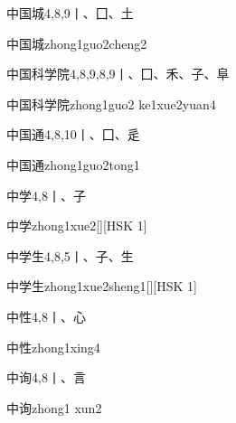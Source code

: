 \begin{entry}{中国城}{4,8,9}{⼁、⼞、⼟}
  \begin{phonetics}{中国城}{zhong1guo2cheng2}
  \end{phonetics}
\end{entry}

\begin{entry}{中国科学院}{4,8,9,8,9}{⼁、⼞、⽲、⼦、⾩}
  \begin{phonetics}{中国科学院}{zhong1guo2 ke1xue2yuan4}
  \end{phonetics}
\end{entry}

\begin{entry}{中国通}{4,8,10}{⼁、⼞、⾡}
  \begin{phonetics}{中国通}{zhong1guo2tong1}
  \end{phonetics}
\end{entry}

\begin{entry}{中学}{4,8}{⼁、⼦}
  \begin{phonetics}{中学}{zhong1xue2}[][HSK 1]
  \end{phonetics}
\end{entry}

\begin{entry}{中学生}{4,8,5}{⼁、⼦、⽣}
  \begin{phonetics}{中学生}{zhong1xue2sheng1}[][HSK 1]
  \end{phonetics}
\end{entry}

\begin{entry}{中性}{4,8}{⼁、⼼}
  \begin{phonetics}{中性}{zhong1xing4}
  \end{phonetics}
\end{entry}

\begin{entry}{中询}{4,8}{⼁、⾔}
  \begin{phonetics}{中询}{zhong1 xun2}
  \end{phonetics}
\end{entry}

